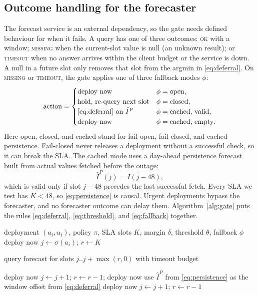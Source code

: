 \documentclass[journal]{IEEEtran}
\begin{document}
\subsection{Outcome handling for the forecaster}
The forecast service is an external dependency, so the gate needs defined behaviour for when it fails. A query has one of three outcomes: \textsc{ok} with a window; \textsc{missing} when the current-slot value is null (an unknown result); or \textsc{timeout} when no answer arrives within the client budget or the service is down. A null in a future slot only removes that slot from the argmin in \eqref{eq:deferral}. On \textsc{missing} or \textsc{timeout}, the gate applies one of three fallback modes $\phi$:
\begin{equation}
\text{action} = \begin{cases}
\text{deploy now} & \phi = \text{open},\\
\text{hold, re-query next slot} & \phi = \text{closed},\\
\text{\eqref{eq:deferral} on } \hat I^{P} & \phi = \text{cached, valid},\\
\text{deploy now} & \phi = \text{cached, empty}.
\end{cases}
\label{eq:fallback}
\end{equation}
Here open, closed, and cached stand for fail-open, fail-closed, and cached persistence. Fail-closed never releases a deployment without a successful check, so it can break the SLA. The cached mode uses a day-ahead persistence forecast built from actual values fetched before the outage:
\begin{equation}
\hat I^{P}(j) = I(j - 48),
\label{eq:persistence}
\end{equation}
which is valid only if slot $j - 48$ precedes the last successful fetch.
Every SLA we test has $K < 48$, so \eqref{eq:persistence} is causal. Urgent deployments bypass the forecaster, and no forecaster outcome can delay them. Algorithm~\ref{alg:gate} puts the rules \eqref{eq:deferral}, \eqref{eq:threshold}, and \eqref{eq:fallback} together.

\begin{algorithm}[!t]
\caption{CarbonGate decision for one deployment}
\label{alg:gate}
\begin{algorithmic}[1]
\Require deployment $(a_i, u_i)$, policy $\pi$, SLA slots $K$, margin $\delta$, threshold $\theta$, fallback $\phi$
 \Return deploy now \EndIf
\State $j \gets \sigma(a_i)$; $r \gets K$
\Loop
  \State \parbox[t]{\dimexpr\linewidth-\algorithmicindent}{query forecast for slots $j..j+\max(r,0)$ with timeout budget\strut}
     \Return deploy now \EndIf
     \State $j \gets j+1$; $r \gets r-1$; \Continue \EndIf
     \Return deploy now \EndIf
    \State use $\hat I^{P}$ from \eqref{eq:persistence} as the window
  \EndIf
   \Return offset from \eqref{eq:deferral} \EndIf
   \Return deploy now \EndIf
  \State $j \gets j+1$; $r \gets r-1$ 
\EndLoop
\end{algorithmic}
\end{algorithm}
\end{document}
